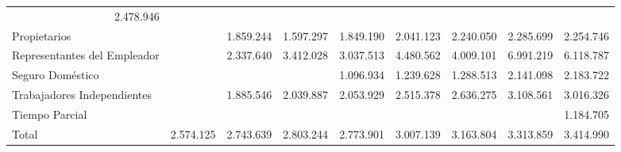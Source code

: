 \begin{tabular}{lllllllll}
  \multicolumn{1}{r}{2.478.946} \\
\multicolumn{1}{l}{\hspace{1em}Propietarios} &
  \multicolumn{1}{|r}{} &
  \multicolumn{1}{r}{1.859.244} &
  \multicolumn{1}{r}{1.597.297} &
  \multicolumn{1}{r}{1.849.190} &
  \multicolumn{1}{r}{2.041.123} &
  \multicolumn{1}{r}{2.240.050} &
  \multicolumn{1}{r}{2.285.699} &
  \multicolumn{1}{r}{2.254.746} \\
\multicolumn{1}{l}{\hspace{1em}Representantes del Empleador} &
  \multicolumn{1}{|r}{} &
  \multicolumn{1}{r}{2.337.640} &
  \multicolumn{1}{r}{3.412.028} &
  \multicolumn{1}{r}{3.037.513} &
  \multicolumn{1}{r}{4.480.562} &
  \multicolumn{1}{r}{4.009.101} &
  \multicolumn{1}{r}{6.991.219} &
  \multicolumn{1}{r}{6.118.787} \\
\multicolumn{1}{l}{\hspace{1em}Seguro Doméstico} &
  \multicolumn{1}{|r}{} &
  \multicolumn{1}{r}{} &
  \multicolumn{1}{r}{} &
  \multicolumn{1}{r}{1.096.934} &
  \multicolumn{1}{r}{1.239.628} &
  \multicolumn{1}{r}{1.288.513} &
  \multicolumn{1}{r}{2.141.098} &
  \multicolumn{1}{r}{2.183.722} \\
\multicolumn{1}{l}{\hspace{1em}Trabajadores Independientes} &
  \multicolumn{1}{|r}{} &
  \multicolumn{1}{r}{1.885.546} &
  \multicolumn{1}{r}{2.039.887} &
  \multicolumn{1}{r}{2.053.929} &
  \multicolumn{1}{r}{2.515.378} &
  \multicolumn{1}{r}{2.636.275} &
  \multicolumn{1}{r}{3.108.561} &
  \multicolumn{1}{r}{3.016.326} \\
\multicolumn{1}{l}{\hspace{1em}Tiempo Parcial} &
  \multicolumn{1}{|r}{} &
  \multicolumn{1}{r}{} &
  \multicolumn{1}{r}{} &
  \multicolumn{1}{r}{} &
  \multicolumn{1}{r}{} &
  \multicolumn{1}{r}{} &
  \multicolumn{1}{r}{} &
  \multicolumn{1}{r}{1.184.705} \\
\multicolumn{1}{l}{\hspace{1em}Total} &
  \multicolumn{1}{|r}{2.574.125} &
  \multicolumn{1}{r}{2.743.639} &
  \multicolumn{1}{r}{2.803.244} &
  \multicolumn{1}{r}{2.773.901} &
  \multicolumn{1}{r}{3.007.139} &
  \multicolumn{1}{r}{3.163.804} &
  \multicolumn{1}{r}{3.313.859} &
  \multicolumn{1}{r}{3.414.990} \\
\cline{1-9}
\end{tabular}
